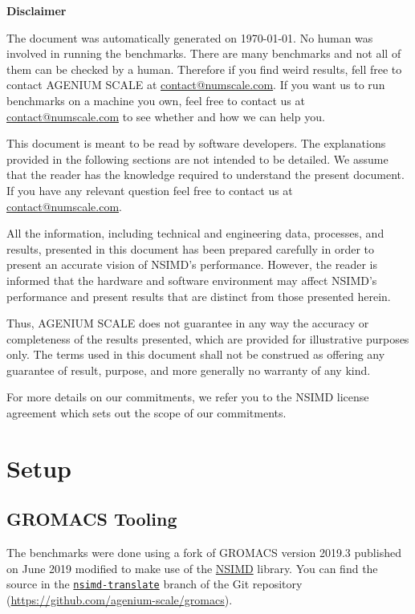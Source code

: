 \documentclass[a4paper,11pt]{article}
\newcommand{\gromacs}{GROMACS}
\newcommand{\nsimd}{NSIMD}
\newcommand{\ageniumscale}{AGENIUM SCALE}
\begin{document}
\begin{mdframed}{
    \textbf{Disclaimer}

    The document was automatically generated on \today. No human was involved in running the benchmarks. There are many benchmarks and not all of them can be checked by a human. Therefore if you find weird results, fell free to contact \ageniumscale{} at \href{mailto://contact@numscale.com}{contact@numscale.com}. If you want us to run benchmarks on a machine you own, feel free to contact us at \href{mailto://contact@numscale.com}{contact@numscale.com} to see whether and how we can help you.

    This document is meant to be read by software developers. The explanations provided in the following sections are not intended to be detailed. We assume that the reader has the knowledge required to understand the present document. If you have any relevant question feel free to contact us at \href{mailto://contact@numscale.com}{contact@numscale.com}.

    All the information, including technical and engineering data, processes, and results, presented in this document has been prepared carefully in order to present an accurate vision of NSIMD's performance. However, the reader is informed that the hardware and software environment may affect NSIMD's performance and present results that are distinct from those presented herein.

    Thus, \ageniumscale{} does not guarantee in any way the accuracy or completeness of the results presented, which are provided for illustrative purposes only. The terms used in this document shall not be construed as offering any guarantee of result, purpose, and more generally no warranty of any kind.

    For more details on our commitments, we refer you to the NSIMD license agreement which sets out the scope of our commitments.
}\end{mdframed}

\section{Setup}%
\label{sec:setup}

\subsection{\gromacs{} Tooling}

The benchmarks were done using a fork of \gromacs{} version 2019.3 published on June 2019 modified to make use of the \href{https://github.com/agenium-scale/nsimd#nsimd}{\nsimd{}} library. You can find the source in the \href{https://github.com/agenium-scale/gromacs/tree/nsimd-translate}{\texttt{nsimd-translate}} branch of the Git repository (\href{https://github.com/agenium-scale/gromacs}{https://github.com/agenium-scale/gromacs}).
\end{document}
